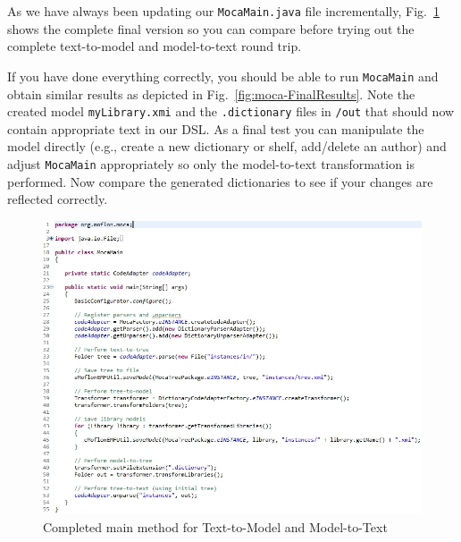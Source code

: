 \begin{enumerate}
As we have always been updating our \texttt{MocaMain.java} file incrementally, Fig.~\ref{fig:moca-FinalMocaMain} shows the complete final version so you can compare before trying out the complete text-to-model and model-to-text round trip.

If you have done everything correctly, you should be able to run \texttt{MocaMain} and obtain similar results as depicted in Fig.~\ref{fig:moca-FinalResults}.
Note the created model \texttt{myLibrary.xmi} and the \texttt{.dictionary} files in \texttt{/out} that should now contain appropriate text in our DSL.
As a final test you can manipulate the model directly (e.g., create a new dictionary or shelf, add/delete an author) and adjust \texttt{MocaMain} appropriately so only the model-to-text transformation is performed.
Now compare the generated dictionaries to see if your changes are reflected correctly. 
 
\begin{figure}[!htbp]
\begin{center}
 \includegraphics[width=\textwidth]{pics/moca/5MocaTreeToText/MocaMainComplete}
  \caption{Completed main method for Text-to-Model and Model-to-Text} 
  \label{fig:moca-FinalMocaMain}
\end{center}
\end{figure}


\end{enumerate}
